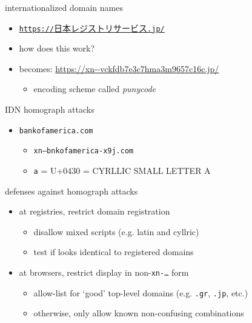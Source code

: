 \begin{frame}{internationalized domain names}
    \begin{itemize}
    \item \href{https://日本レジストリサービス.jp}{\texttt{https://}{日本レジストリサービス}\texttt{.jp/}}
    \item how does this work?
    \vspace{.5cm}
    \item becomes: \url{https://xn--vckfdb7e3c7hma3m9657c16c.jp/}
        \begin{itemize}
        \item encoding scheme called \textit{punycode}
        \end{itemize}
    \end{itemize}
\end{frame}

\begin{frame}{IDN homograph attacks}
    \begin{itemize}
    \item \texttt{bаnkofamerica.com}
        \begin{itemize}
        \item \texttt{xn--bnkofamerica-x9j.com}
        \item \texttt{а} = U+0430 = CYRLLIC SMALL LETTER A
        \end{itemize}
    \end{itemize}
\end{frame}

\begin{frame}{defenses against homograph attacks}
    \begin{itemize}
    \item at registries, restrict domain registration
        \begin{itemize}
        \item disallow mixed scripts (e.g. latin and cyllric)
        \item test if looks identical to registered domains
        \end{itemize}
    \item at browsers, restrict display in non-\texttt{xn-\ldots} form
        \begin{itemize}
        \item allow-list for `good' top-level domains (e.g. \texttt{.gr}, \texttt{.jp}, etc.)
        \item otherwise, only allow known non-confusing combinations
        \end{itemize}
    \end{itemize}
\end{frame}
